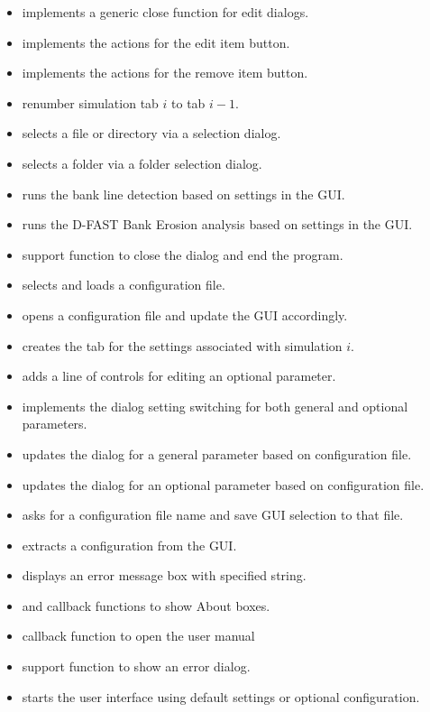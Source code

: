 \begin{itemize}
\item {} implements a generic close function for edit dialogs.
\item {} implements the actions for the edit item button.
\item {} implements the actions for the remove item button.
\item {} renumber simulation tab $i$ to tab $i-1$.
\item {} selects a file or directory via a selection dialog.
\item {} selects a folder via a folder selection dialog.
\item {} runs the bank line detection based on settings in the GUI.
\item {} runs the D-FAST Bank Erosion analysis based on settings in the GUI.
\item {} support function to close the dialog and end the program.
\item {} selects and loads a configuration file.
\item {} opens a configuration file and update the GUI accordingly.
\item {} creates the tab for the settings associated with simulation $i$.
\item {} adds a line of controls for editing an optional parameter.
\item {} implements the dialog setting switching for both general and optional parameters.
\item {} updates the dialog for a general parameter based on configuration file.
\item {} updates the dialog for an optional parameter based on configuration file.
\item {} asks for a configuration file name and save GUI selection to that file.
\item {} extracts a configuration from the GUI.
\item {} displays an error message box with specified string.
\item {} and  callback functions to show About boxes.
\item {} callback function to open the user manual
\item {} support function to show an error dialog.
\item {} starts the user interface using default settings or optional configuration.
\end{itemize}


